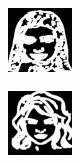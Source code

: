 \documentclass{IEEEcsmag}
\begin{document}
\begin{figure}[ht]
\begin{subfigure}{0.12\textwidth}
    \end{subfigure}
    \begin{subfigure}{0.12\textwidth}
        \includegraphics[width=\linewidth]{Random sketch/edge_map_resized/image2.jpeg}
    \end{subfigure}
    \begin{subfigure}{0.12\textwidth}
        \includegraphics[width=\linewidth]{Digital sketches/edge_map_resized/image7.jpeg}
    \end{subfigure}


\end{figure}
\end{document}

